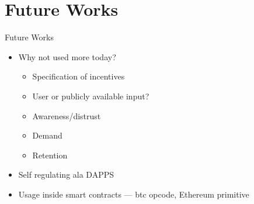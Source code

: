 \section{Future Works}

\begin{frame}{Future Works}
    \begin{itemize}
        \item Why not used more today?
            \begin{itemize}
                \item Specification of incentives
                \item User or publicly available input?
                \item Awareness/distrust
                \item Demand
                \item Retention
            \end{itemize}
        \item Self regulating ala DAPPS
        \item Usage inside smart contracts --- btc opcode, Ethereum primitive
    \end{itemize}
\end{frame}

